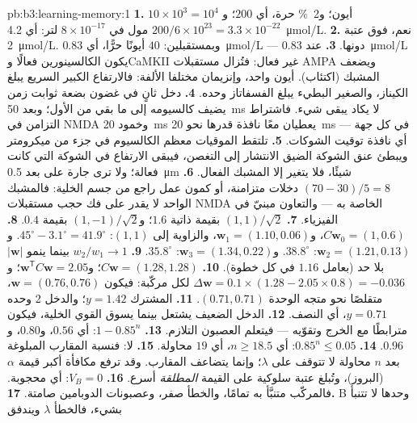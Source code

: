 \begin{solution}{pb:b3:learning-memory:1}
\textbf{1.} $10\times 10^{3} = 10^{4}$ أيون؛ و\qty{2}{\%} حرة، أي $200$؛
و$200/6\times 10^{23} = 3.3\times 10^{-22}$ مول في $8\times 10^{-17}$ لتر:
أي \qty{4.2}{\micro mol/L}.
\textbf{2.} نعم، فوق عتبة \qty{2}{\micro mol/L}. وبمستقبلين:
$40$ أيونًا حرًّا، أي \qty{0.83}{\micro mol/L} --- دونها.
\textbf{3.} عند \qty{0.83}{\micro mol/L} يكون الكالسينورين فعالًا
وCaMKII غير فعال: فتُزال مستقبلات AMPA ويضعف المشبك (اكتئاب).
أيون واحد، وإنزيمان مختلفا الألفة: فالارتفاع الكبير السريع
يبلغ الكيناز، والصغير البطيء يبلغ الفسفاتاز وحده.
\textbf{4.} دخل ثانٍ في غضون بضعة ثوابت زمن يضيف كالسيومه إلى
ما بقي من الأول؛ وبعد \qty{50}{ms} لا يكاد يبقى شيء.
فاشتراط التزامن في NMDA وخمود \qty{20}{ms} يعطيان معًا نافذة
قدرها نحو \qty{20}{ms} في كل جهة --- أي نافذة توقيت الشوكات.
\textbf{5.} تلتقط الموقيات معظم الكالسيوم في جزء من ميكرومتر
ويبطئ عنق الشوكة الضيق الانتشار إلى التغصن، فيبقى الارتفاع
في الشوكة التي كانت فعالة؛ ولا ترى جارة على بعد
\qty{0.5}{\micro m} شيئًا، فلا يتغير إلا المشبك الفعال.
\textbf{6.} $(70 - 30)/5 = 8$ دخلات متزامنة، أو كمون عمل راجع
من جسم الخلية: فالمشبك الواحد لا يقدر على فك حجب مستقبلات
NMDA الخاصة به --- والتعاون مبنيّ في الفيزياء.
\textbf{7.} $(1,1)/\sqrt{2}$ بقيمة ذاتية $1.6$؛ و$(1,-1)/\sqrt{2}$
بقيمة $0.4$.
\textbf{8.} $C\mathbf{w}_{0} = (1, 0.6)$، و$\mathbf{w}_{1} = (1.10,
0.06)$، والزاوية إلى $(1,1)$: $45^{\circ} - 3.1^{\circ} = 41.9^{\circ}$.
و$\mathbf{w}_{2} = (1.21, 0.13)$: $38.8^{\circ}$. و$\mathbf{w}_{3} = (1.34,
0.22)$: $35.8^{\circ}$.
\textbf{9.} $w_{2}/w_{1} \to 1$ بينما ينمو $|\mathbf{w}|$ بلا حد
(بعامل $1.16$ في كل خطوة).
\textbf{10.} $C\mathbf{w} = (1.28, 1.28)$؛ و$\mathbf{w}^{\mathsf{T}}C
\mathbf{w} = 2.05$؛ و$\Delta\mathbf{w} = 0.1\times(1.28 - 2.05\times 0.8)
= -0.036$ لكل مركّبة: فيكون $\mathbf{w} = (0.76, 0.76)$، متقلصًا نحو
متجه الوحدة $(0.71, 0.71)$.
\textbf{11.} المشترك $y = 1.42$؛ والدخل 2 وحده $y = 0.71$، أي النصف.
\textbf{12.} الدخل الضعيف يشتعل بينما يسوق القوي الخلية، فيكون
مترابطًا مع الخرج وتقوّيه  --- فيتعلم العصبون
التلازم.
\textbf{13.} $1 - 0.85^{n}$: أي $0.56$، و$0.80$، و$0.96$.
\textbf{14.} $0.85^{n} \le 0.05$: أي $n \ge 18.5$، أي $19$ محاولة.
\textbf{15.} لا: فنسبة المقارب المبلوغة بعد $n$ محاولة لا
تتوقف على $\lambda$؛ وإنما يتضاعف المقارب. وقد ترفع مكافأة
أكبر قيمة $\alpha$ (البروز)، وتُبلغ عتبة سلوكية على القيمة
\emph{المطلقة} أسرع.
\textbf{16.} $V_{B} = 0$: أي محجوبة. فالمركّب متنبَّأ به
تمامًا، والخطأ صفر، وعصبونات الدوبامين صامتة.
\textbf{17.} B وحدها لا تتنبأ بشيء، فالخطأ $\lambda$ ويندفق

\end{solution}
